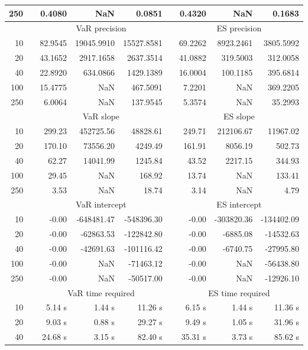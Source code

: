 {{\begin{longtable}{rr rrr r rrr}
250 && 0.4080  &    NaN  & 0.0851 && 0.4320  &    NaN  & 0.1683  \\ 
\hline 
 & & \multicolumn{3}{c}{VaR precision} &&  \multicolumn{3}{c}{ES precision} \\ \cline{3-5}  \cline{7-9}
10 &&  82.9545 & 19045.9910 & 15527.8581 & & 69.2262 & 8923.2461 & 3805.5992 \\ 
20 &&  43.1652 & 2917.1658 & 2637.3514 & & 41.0882 & 319.5003 & 312.0058 \\ 
40 &&  22.8920 & 634.0866 & 1429.1389 & & 16.0004 & 100.1185 & 395.6814 \\ 
100 &&  15.4775 &    NaN & 467.5091 & & 7.2201 &    NaN & 369.2205 \\ 
250 &&  6.0064 &    NaN & 137.9545 & & 5.3574 &    NaN & 35.2993 \\ 
\hline 
 & & \multicolumn{3}{c}{ VaR slope} && \multicolumn{3}{c}{ES slope} \\ \cline{3-5}  \cline{7-9}
10 && 299.23 & 452725.56 & 48828.61 && 249.71 & 212106.67 & 11967.02 \\ 
20 && 170.10 & 73556.20 & 4249.49 && 161.91 & 8056.19 & 502.73 \\ 
40 && 62.27 & 14041.99 & 1245.84 && 43.52 & 2217.15 & 344.93 \\ 
100 && 29.45 &  NaN & 168.92 && 13.74 &  NaN & 133.41 \\ 
250 && 3.53 &  NaN & 18.74 && 3.14 &  NaN & 4.79 \\ 
\hline 
 & & \multicolumn{3}{c}{ VaR intercept} &&  \multicolumn{3}{c}{ES intercept} \\ \cline{3-5}  \cline{7-9}
10 &&  -0.00 & -648481.47 & -548396.30 && -0.00 & -303820.36 & -134402.09 \\ 
20 &&  -0.00 & -62863.53 & -122842.80 && -0.00 & -6885.08 & -14532.63 \\ 
40 &&  -0.00 & -42691.63 & -101116.42 && -0.00 & -6740.75 & -27995.80 \\ 
100 &&  -0.00 &  NaN & -71463.12 && -0.00 &  NaN & -56438.80 \\ 
250 &&  -0.00 &  NaN & -50517.00 && -0.00 &  NaN & -12926.10 \\ 
\hline 
 & & \multicolumn{3}{c}{VaR time required} && \multicolumn{3}{c}{ES time required} \\ \cline{3-5}  \cline{7-9}
10 & & 5.14 s & 1.44 s & 11.26 s && 6.15 s & 1.44 s & 11.36 s \\ 
20 & & 9.03 s & 0.88 s & 29.27 s && 9.49 s & 1.05 s & 31.96 s \\ 
40 & & 24.68 s & 3.15 s & 82.40 s && 35.31 s & 3.73 s & 85.62 s \\ 

\end{longtable}}}

